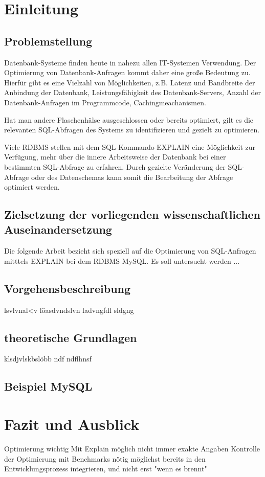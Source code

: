 \chapter{Einleitung}
\section{Problemstellung}
Datenbank-Systeme finden heute in nahezu allen IT-Systemen Verwendung.
Der Optimierung von Datenbank-Anfragen kommt daher eine große Bedeutung zu.
Hierfür gibt es eine Vielzahl von Möglichkeiten, z.B. Latenz und Bandbreite der Anbindung der Datenbank, Leistungsfähigkeit des Datenbank-Servers, Anzahl der Datenbank-Anfragen im Programmcode, Cachingmeachanismen.

Hat man andere Flaschenhälse ausgeschlossen oder bereits optimiert,  gilt es die relevanten SQL-Abfragen des Systems zu identifizieren und gezielt zu optimieren.

Viele RDBMS stellen mit dem SQL-Kommando EXPLAIN eine Möglichkeit zur Verfügung, mehr über die innere Arbeitsweise der Datenbank bei einer bestimmten SQL-Abfrage zu erfahren.
Durch gezielte Veränderung der SQL-Abfrage oder des Datenschemas kann somit die Bearbeitung der Abfrage optimiert werden.

\section{Zielsetzung der vorliegenden  wissenschaftlichen  Auseinandersetzung}
Die folgende Arbeit bezieht sich speziell auf die Optimierung von SQL-Anfragen mitttels EXPLAIN bei dem RDBMS MySQL.
Es soll untersucht werden ...

\section{Vorgehensbeschreibung}
lsvlvnal<v löasdvndslvn ladvngfdl sldgng

\section{theoretische Grundlagen}
klsdjvlskbslöbb ndf ndflhnsf

\section{Beispiel MySQL}


\chapter{Fazit und Ausblick}

Optimierung wichtig
Mit Explain möglich
nicht immer exakte Angaben
Kontrolle der Optimierung mit Benchmarks nötig
möglichst bereits in den Entwicklungsprozess integrieren, und nicht erst "wenn es brennt"

